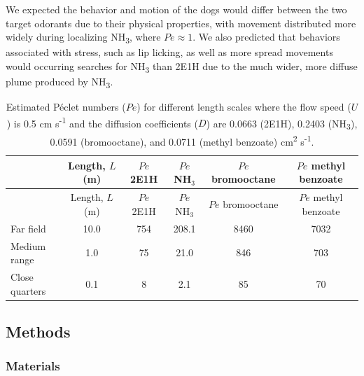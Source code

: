 \documentclass[
]{article}
\begin{document}
We expected the behavior and motion of the dogs would differ between the two target odorants due to their physical properties, with movement distributed more widely during localizing NH\textsubscript{3}, where \(Pe \approx 1\). We also predicted that behaviors associated with stress, such as lip licking, as well as more spread movements would occurring searches for NH\textsubscript{3} than 2E1H due to the much wider, more diffuse plume produced by NH\textsubscript{3}.

\begin{longtable}[]{@{}lccccc@{}}
\caption{\label{tab:pe-table}Estimated Péclet numbers (\(Pe\)) for different length scales where the flow speed (\(U\)) is 0.5 cm s\textsuperscript{-1} and the diffusion coefficients (\(D\)) are 0.0663 (2E1H), 0.2403 (NH\textsubscript{3}), 0.0591 (bromooctane), and 0.0711 (methyl benzoate) cm\textsuperscript{2} s\textsuperscript{-1}.}\tabularnewline
\toprule\noalign{}
& Length, \(L\) (m) & \(Pe\) 2E1H & \(Pe\) NH\(_3\) & \(Pe\) bromooctane & \(Pe\) methyl benzoate \\
\midrule\noalign{}
\endfirsthead
\toprule\noalign{}
& Length, \(L\) (m) & \(Pe\) 2E1H & \(Pe\) NH\(_3\) & \(Pe\) bromooctane & \(Pe\) methyl benzoate \\
\midrule\noalign{}
\endhead
\bottomrule\noalign{}
\endlastfoot
Far field & 10.0 & 754 & 208.1 & 8460 & 7032 \\
Medium range & 1.0 & 75 & 21.0 & 846 & 703 \\
Close quarters & 0.1 & 8 & 2.1 & 85 & 70 \\
\end{longtable}

\hypertarget{methods}{%
\subsection{Methods}\label{methods}}

\hypertarget{materials}{%
\subsubsection{Materials}\label{materials}}
\end{document}
